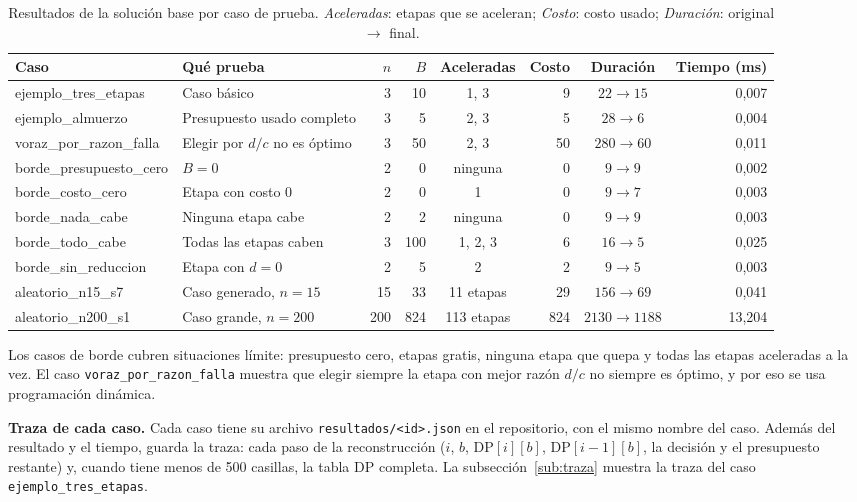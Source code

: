 \documentclass[11pt,a4paper]{article}
\newcommand{\DP}[2]{\mathrm{DP}[#1][#2]}
\theoremstyle{plano}
\begin{document}
\begin{table}[h]
\centering\scriptsize
\setlength{\tabcolsep}{2.6pt}
\begin{tabular}{@{}>{\ttfamily}p{3.2cm}p{3.5cm}rrcrcr@{}}
\toprule
\normalfont Caso & Qué prueba & $n$ & $B$ & Aceleradas & Costo & Duración & Tiempo (ms) \\
\midrule
ejemplo\_tres\_etapas & Caso básico & 3 & 10 & 1, 3 & 9 & $22\to 15$ & 0,007 \\
ejemplo\_almuerzo & Presupuesto usado completo & 3 & 5 & 2, 3 & 5 & $28\to 6$ & 0,004 \\
voraz\_por\_razon\_falla & Elegir por $d/c$ no es óptimo & 3 & 50 & 2, 3 & 50 & $280\to 60$ & 0,011 \\
borde\_presupuesto\_cero & $B=0$ & 2 & 0 & ninguna & 0 & $9\to 9$ & 0,002 \\
borde\_costo\_cero & Etapa con costo 0 & 2 & 0 & 1 & 0 & $9\to 7$ & 0,003 \\
borde\_nada\_cabe & Ninguna etapa cabe & 2 & 2 & ninguna & 0 & $9\to 9$ & 0,003 \\
borde\_todo\_cabe & Todas las etapas caben & 3 & 100 & 1, 2, 3 & 6 & $16\to 5$ & 0,025 \\
borde\_sin\_reduccion & Etapa con $d=0$ & 2 & 5 & 2 & 2 & $9\to 5$ & 0,003 \\
aleatorio\_n15\_s7 & Caso generado, $n=15$ & 15 & 33 & 11 etapas & 29 & $156\to 69$ & 0,041 \\
aleatorio\_n200\_s1 & Caso grande, $n=200$ & 200 & 824 & 113 etapas & 824 & $2130\to 1188$ & 13,204 \\
\bottomrule
\end{tabular}
\caption{Resultados de la solución base por caso de prueba. \textit{Aceleradas}: etapas que se aceleran; \textit{Costo}: costo usado; \textit{Duración}: original $\to$ final.}
\label{tab:resultados}
\end{table}

Los casos de borde cubren situaciones límite: presupuesto cero, etapas gratis, ninguna etapa que quepa y todas las etapas aceleradas a la vez. El caso \texttt{voraz\_por\_razon\_falla} muestra que elegir siempre la etapa con mejor razón $d/c$ no siempre es óptimo, y por eso se usa programación dinámica.

\textbf{Traza de cada caso.} Cada caso tiene su archivo \texttt{resultados/<id>.json} en el repositorio, con el mismo nombre del caso. Además del resultado y el tiempo, guarda la traza: cada paso de la reconstrucción ($i$, $b$, $\DP{i}{b}$, $\DP{i-1}{b}$, la decisión y el presupuesto restante) y, cuando tiene menos de 500 casillas, la tabla DP completa. La subsección~\ref{sub:traza} muestra la traza del caso \texttt{ejemplo\_tres\_etapas}.
\end{document}
